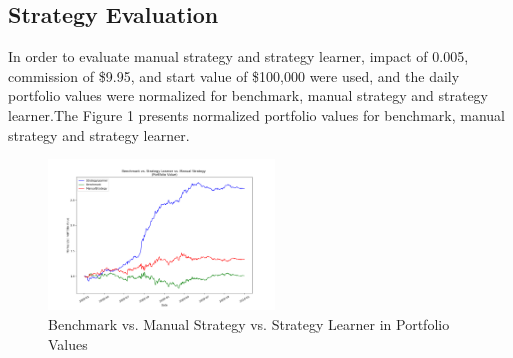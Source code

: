 \documentclass{amia}
\begin{document}
\subsection*{Strategy Evaluation}
In order to evaluate manual strategy and strategy learner, impact of 0.005, commission of \$9.95, and start value of \$100,000 were used, and the daily portfolio values were normalized for benchmark, manual strategy and strategy learner.The Figure 1 presents normalized portfolio values for benchmark, manual strategy and strategy learner. 
\vspace{-1mm}
\begin{figure}[H]
	\centering
	\includegraphics[height=4cm]{pics/exp1.png}
	\caption{Benchmark vs. Manual Strategy vs. Strategy Learner in Portfolio Values}
\end{figure}
\end{document}
